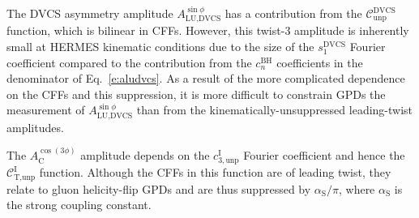 The DVCS asymmetry amplitude $A^{\sin\phi}_{\textrm{LU,DVCS}}$ has a
contribution from the $\mathcal{C}_{\textrm{unp}}^{\textrm{DVCS}}$ function,
which is bilinear in CFFs. However, this twist-3 amplitude is inherently small at HERMES kinematic conditions due to the size of the $s_{1}^{\textrm{DVCS}}$ Fourier coefficient compared to the contribution from the $c_{n}^{\textrm{BH}}$ coefficients in the denominator of Eq.~\ref{e:aludvcs}. As a result of
the more complicated dependence on the CFFs and this suppression, it
is more difficult to constrain GPDs
 the measurement of $A^{\sin\phi}_{\textrm{LU,DVCS}}$ than from the
kinematically-unsuppressed leading-twist amplitudes.

The $A^{\cos(3\phi)}_{\textrm{C}}$ amplitude depends on the
$c_{3,\textrm{unp}}^{\textrm{I}}$ Fourier coefficient and hence the
$\mathcal{C}_{\textrm{T,unp}}^{\textrm{I}}$ function. Although the CFFs
in this function are of leading twist, they relate to gluon helicity-flip GPDs and are thus suppressed by $\alpha_{\textrm{S}}/\pi$,
where $\alpha_{\textrm{S}}$ is the strong coupling constant.
